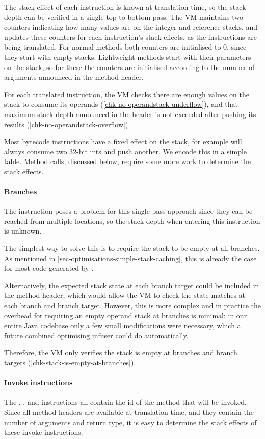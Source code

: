The stack effect of each instruction is known at translation time, so the stack depth can be verified in a single top to bottom pass. The VM maintains two counters indicating how many values are on the integer and reference stacks, and updates these counters for each instruction's stack effects, as the instructions are being translated. For normal methods both counters are initialised to 0, since they start with empty stacks. Lightweight methods start with their parameters on the stack, so for these the counters are initialised according to the number of arguments announced in the method header.

For each translated instruction, the VM checks there are enough values on the stack to consume its operands (\ref{chk-no-operandstack-underflow}), and that maximum stack depth announced in the header is not exceeded after pushing its results (\ref{chk-no-operandstack-overflow}).

Most bytecode instructions have a fixed effect on the stack, for example  will always consume two 32-bit ints and push another. We encode this in a simple table. Method calls, discussed below, require some more work to determine the stack effects. 

\paragraph{Branches}
The  instruction poses a problem for this single pass approach since they can be reached from multiple locations, so the stack depth when entering this instruction is unknown.

The simplest way to solve this is to require the stack to be empty at all branches. As mentioned in \ref{sec-optimisations-simple-stack-caching}, this is already the case for most code generated by .

Alternatively, the expected stack state at each branch target could be included in the method header, which would allow the VM to check the state matches at each branch and branch target. However, this is more complex and in practice the overhead for requiring an empty operand stack at branches is minimal: in our entire Java codebase only a few small modifications were necessary, which a future combined optimising infuser could do automatically.

Therefore, the VM only verifies the stack is empty at branches and branch targets (\ref{chk-stack-is-empty-at-branches}).

\paragraph{Invoke instructions}
The , , and  instructions all contain the id of the method that will be invoked. Since all method headers are available at translation time, and they contain the number of arguments and return type, it is easy to determine the stack effects of these invoke instructions.
 
